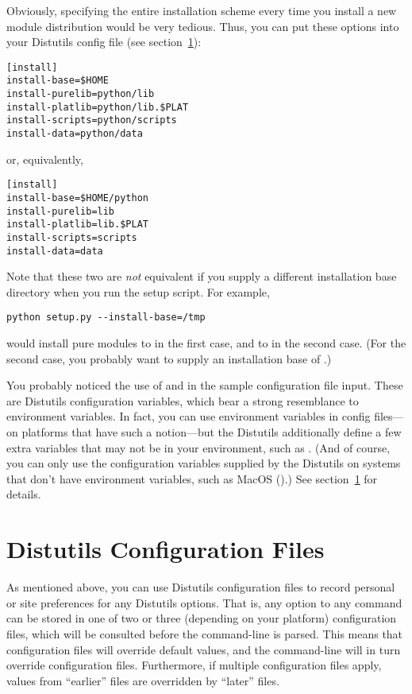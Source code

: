 \documentclass{howto}
\begin{document}
Obviously, specifying the entire installation scheme every time you
install a new module distribution would be very tedious.  Thus, you can
put these options into your Distutils config file (see
section~\ref{config-files}):
\begin{verbatim}
[install]
install-base=$HOME
install-purelib=python/lib
install-platlib=python/lib.$PLAT
install-scripts=python/scripts
install-data=python/data
\end{verbatim}
or, equivalently,
\begin{verbatim}
[install]
install-base=$HOME/python
install-purelib=lib
install-platlib=lib.$PLAT
install-scripts=scripts
install-data=data
\end{verbatim}
Note that these two are \emph{not} equivalent if you supply a different
installation base directory when you run the setup script.  For example,
\begin{verbatim}
python setup.py --install-base=/tmp
\end{verbatim}
would install pure modules to  in the first
case, and to  in the second case.  (For the second
case, you probably want to supply an installation base of
.)

You probably noticed the use of  and  in the
sample configuration file input.  These are Distutils configuration
variables, which bear a strong resemblance to environment variables.  In
fact, you can use environment variables in config files---on platforms
that have such a notion---but the Distutils additionally define a few
extra variables that may not be in your environment, such as
.  (And of course, you can only use the configuration
variables supplied by the Distutils on systems that don't have
environment variables, such as MacOS ().)  See
section~\ref{config-files} for details.



\section{Distutils Configuration Files}
\label{config-files}

As mentioned above, you can use Distutils configuration files to record
personal or site preferences for any Distutils options.  That is, any
option to any command can be stored in one of two or three (depending on
your platform) configuration files, which will be consulted before the
command-line is parsed.  This means that configuration files will
override default values, and the command-line will in turn override
configuration files.  Furthermore, if multiple configuration files
apply, values from ``earlier'' files are overridden by ``later'' files.
\end{document}
